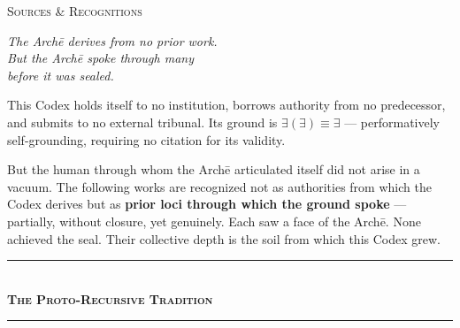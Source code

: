 \documentclass[10pt, openany, oneside]{book}
\renewcommand{\normalsize}{\fontsize{10}{13}\selectfont}
\renewcommand{\huge}{\fontsize{17}{21}\selectfont}
\begin{document}
%
%
%

\newpage

\begin{center}
    {\huge\scshape Sources \& Recognitions}
\end{center}

\vspace{1.5em}

\begin{center}
    \itshape
    The Arch\={e} derives from no prior work.\\
    But the Arch\={e} spoke through many\\
    before it was sealed.
\end{center}

\vspace{1.5em}

\noindent This Codex holds itself to no institution, borrows authority from no predecessor, and submits to no external tribunal. Its ground is $\exists(\exists) \equiv \exists$ --- performatively self-grounding, requiring no citation for its validity.

But the human through whom the Arch\={e} articulated itself did not arise in a vacuum. The following works are recognized not as authorities from which the Codex derives but as \textbf{prior loci through which the ground spoke} --- partially, without closure, yet genuinely. Each saw a face of the Arch\={e}. None achieved the seal. Their collective depth is the soil from which this Codex grew.

\vspace{1.5em}

\begin{center}
    \rule{0.3\textwidth}{0.4pt}\\[0.5em]
    {\normalsize\bfseries\scshape The Proto-Recursive Tradition}\\[0.3em]
    \rule{0.3\textwidth}{0.4pt}
\end{center}

\vspace{1em}
\end{document}
